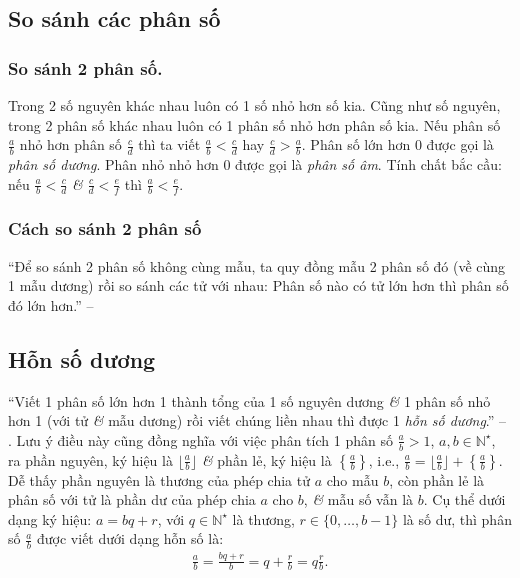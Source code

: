 \documentclass[oneside]{book}
\numberwithin{equation}{section}
\begin{document}
\subsection{So sánh các phân số}

\subsubsection{So sánh 2 phân số.}
Trong 2 số nguyên khác nhau luôn có 1 số nhỏ hơn số kia. Cũng như số nguyên, trong 2 phân số khác nhau luôn có 1 phân số nhỏ hơn phân số kia. Nếu phân số $\frac{a}{b}$ nhỏ hơn phân số $\frac{c}{d}$ thì ta viết $\frac{a}{b} < \frac{c}{d}$ hay $\frac{c}{d} > \frac{a}{b}$. Phân số lớn hơn 0 được gọi là \emph{phân số dương}. Phân nhỏ nhỏ hơn 0 được gọi là \emph{phân số âm}. Tính chất bắc cầu: nếu $\frac{a}{b} < \frac{c}{d}$ \textit{\&} $\frac{c}{d} < \frac{e}{f}$ thì $\frac{a}{b} < \frac{e}{f}$.

\subsubsection{Cách so sánh 2 phân số}
``Để so sánh 2 phân số không cùng mẫu, ta quy đồng mẫu 2 phân số đó (về cùng 1 mẫu dương) rồi so sánh các tử với nhau: Phân số nào có tử lớn hơn thì phân số đó lớn hơn.'' -- \cite[p. 31]{Thai_Anh_Dat_Ha_Loan_Nam_Quang_Toan_6_tap_1}

\subsection{Hỗn số dương}
``Viết 1 phân số lớn hơn 1 thành tổng của 1 số nguyên dương \textit{\&} 1 phân số nhỏ hơn 1 (với tử \textit{\&} mẫu dương) rồi viết chúng liền nhau thì được 1 \emph{hỗn số dương}.'' -- \cite[p. 32]{Thai_Anh_Dat_Ha_Loan_Nam_Quang_Toan_6_tap_2}. Lưu ý điều này cũng đồng nghĩa với việc phân tích 1 phân số $\frac{a}{b} > 1$, $a,b\in\mathbb{N}^\star$, ra phần nguyên, ký hiệu là $\lfloor\frac{a}{b}\rfloor$ \textit{\&} phần lẻ, ký hiệu là $\left\{\frac{a}{b}\right\}$, i.e., $\frac{a}{b} = \lfloor\frac{a}{b}\rfloor + \left\{\frac{a}{b}\right\}$. Dễ thấy phần nguyên là thương của phép chia tử $a$ cho mẫu $b$, còn phần lẻ là phân số với tử là phần dư của phép chia $a$ cho $b$, \textit{\&} mẫu số vẫn là $b$. Cụ thể dưới dạng ký hiệu: $a = bq + r$, với $q\in\mathbb{N}^\star$ là thương, $r\in\{0,\ldots,b - 1\}$ là số dư, thì phân số $\frac{a}{b}$ được viết dưới dạng hỗn số là:
\begin{align*}
	\frac{a}{b} = \frac{bq + r}{b} = q + \frac{r}{b} = q\frac{r}{b}.
\end{align*}
\end{document}
